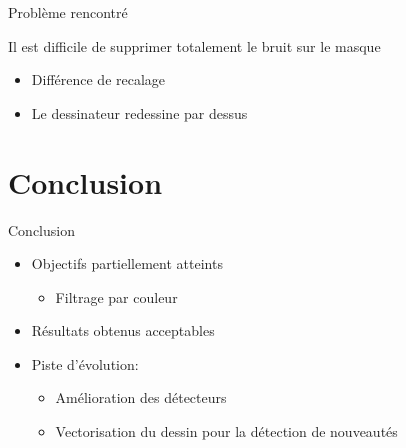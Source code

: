 \documentclass[t,14pt]{beamer}
\begin{document}
\begin{frame}{Problème rencontré}
\vspace{5mm}
\begin{block}{}
Il est difficile de supprimer totalement le bruit sur le masque
\end{block}
\begin{itemize}
\item Différence de recalage
\item Le dessinateur redessine par dessus
\end{itemize}
\end{frame}	


\section[Conclusion]{Conclusion}
	\begin{frame}{Conclusion}
		\vspace*{5mm}
		\begin{itemize}
		\item Objectifs partiellement atteints
		\begin{itemize}
		\item Filtrage par couleur
		\end{itemize}
		\item Résultats obtenus acceptables
		\item Piste d'évolution:
		\begin{itemize}
		\item Amélioration des détecteurs
		\item Vectorisation du dessin pour la détection de nouveautés
		\end{itemize}
		\end{itemize}
	\end{frame}
\end{document}
